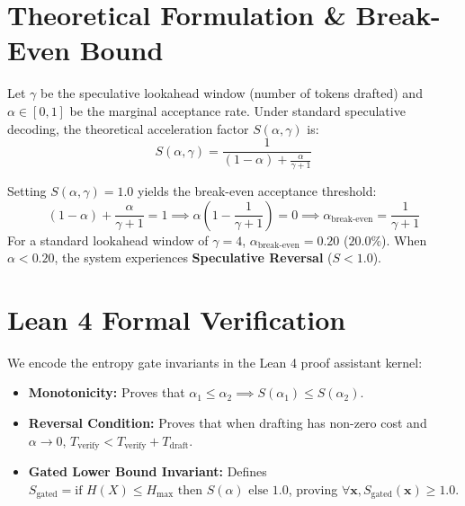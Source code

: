 \documentclass[11pt,a4paper]{article}
\begin{document}
\section{Theoretical Formulation \& Break-Even Bound}
Let $\gamma$ be the speculative lookahead window (number of tokens drafted) and $\alpha \in [0, 1]$ be the marginal acceptance rate. Under standard speculative decoding, the theoretical acceleration factor $S(\alpha, \gamma)$ is:
\begin{equation}
S(\alpha, \gamma) = \frac{1}{(1 - \alpha) + \frac{\alpha}{\gamma + 1}}
\end{equation}

Setting $S(\alpha, \gamma) = 1.0$ yields the break-even acceptance threshold:
\begin{equation}
(1 - \alpha) + \frac{\alpha}{\gamma + 1} = 1 \implies \alpha \left(1 - \frac{1}{\gamma + 1}\right) = 0 \implies \alpha_{\text{break-even}} = \frac{1}{\gamma + 1}
\end{equation}
For a standard lookahead window of $\gamma = 4$, $\alpha_{\text{break-even}} = 0.20$ ($20.0\%$). When $\alpha < 0.20$, the system experiences \textbf{Speculative Reversal} ($S < 1.0$).

\section{Lean 4 Formal Verification}
We encode the entropy gate invariants in the Lean 4 proof assistant kernel:
\begin{itemize}
    \item \textbf{Monotonicity:} Proves that $\alpha_1 \le \alpha_2 \implies S(\alpha_1) \le S(\alpha_2)$.
    \item \textbf{Reversal Condition:} Proves that when drafting has non-zero cost and $\alpha \to 0$, $T_{\text{verify}} < T_{\text{verify}} + T_{\text{draft}}$.
    \item \textbf{Gated Lower Bound Invariant:} Defines $S_{\text{gated}} = \text{if } H(X) \le H_{\text{max}} \text{ then } S(\alpha) \text{ else } 1.0$, proving $\forall \mathbf{x}, S_{\text{gated}}(\mathbf{x}) \ge 1.0$.
\end{itemize}
\end{document}

